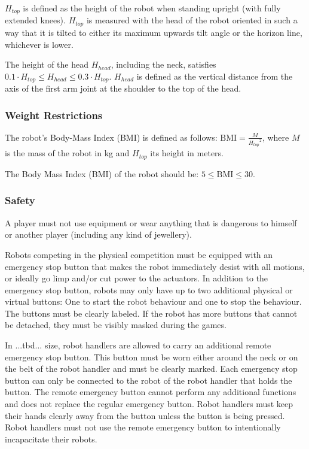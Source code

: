 $H_{top}$ is defined as the height of the robot when standing upright (with fully extended knees).
$H_{top}$ is measured with the head of the robot oriented in such a way that it
is tilted to either its maximum upwards tilt angle or the horizon line,
whichever is lower.

The height of the head $H_{head}$, including the neck, satisfies $0.1 \cdot H_{top} \leq H_{head} \leq 0.3 \cdot H_{top}$. $H_{head}$ is defined as the vertical distance from the axis of the first arm joint at the shoulder to the top of the head.

\subsubsection{Weight Restrictions}

The robot's Body-Mass Index (BMI) is defined as follows:
$\mathrm{BMI} = \frac{M}{{H_{top}}^2}$,
where $M$ is the mass of the robot in kg and $H_{top}$ its height in meters.

The Body Mass Index (BMI) of the robot should be: $5 \leq \mathrm{BMI} \leq 30$.

\subsubsection{Safety}

A player must not use equipment or wear anything that is dangerous to himself or another player (including any kind of jewellery).

Robots competing in the physical competition must be equipped with an emergency stop button that makes the robot immediately desist with all motions, 
or ideally go limp and/or cut power to the actuators.
In addition to the emergency stop button, robots may only have up to two additional physical or virtual buttons: One to start the robot behaviour and one to stop the behaviour. 
The buttons must be clearly labeled. If the robot has more buttons that cannot be detached, they must be visibly masked during the games.

In ...tbd... size, robot handlers are allowed to carry an additional remote emergency stop button. 
This button must be worn either around the neck or on the belt of the robot handler and must be clearly marked. 
Each emergency stop button can only be connected to the robot of the robot handler that holds the button.
The remote emergency button cannot perform any additional functions and does not replace the regular emergency button. 
Robot handlers must keep their hands clearly away from the button unless the button is being pressed. 
Robot handlers must not use the remote emergency button to intentionally incapacitate their robots.

